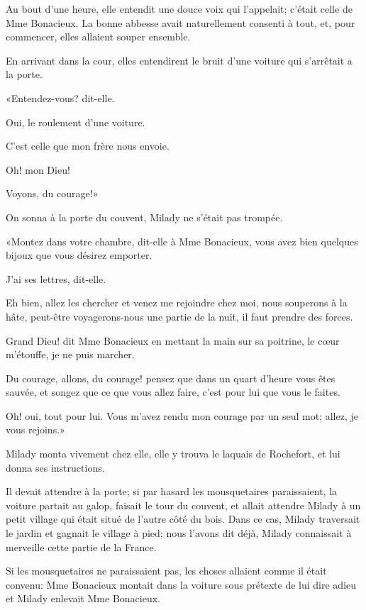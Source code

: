 Au bout d'une heure, elle entendit une douce voix qui l'appelait; c'était celle de Mme Bonacieux. La bonne abbesse avait naturellement consenti à tout, et, pour commencer, elles allaient souper ensemble. 

En arrivant dans la cour, elles entendirent le bruit d'une voiture qui s'arrêtait a la porte. 

«Entendez-vous? dit-elle. 

\speak  Oui, le roulement d'une voiture. 

\speak  C'est celle que mon frère nous envoie. 

\speak  Oh! mon Dieu! 

\speak  Voyons, du courage!» 

On sonna à la porte du couvent, Milady ne s'était pas trompée. 

«Montez dans votre chambre, dit-elle à Mme Bonacieux, vous avez bien quelques bijoux que vous désirez emporter. 

\speak  J'ai ses lettres, dit-elle. 

\speak  Eh bien, allez les chercher et venez me rejoindre chez moi, nous souperons à la hâte, peut-être voyagerons-nous une partie de la nuit, il faut prendre des forces. 

\speak  Grand Dieu! dit Mme Bonacieux en mettant la main sur sa poitrine, le cœur m'étouffe, je ne puis marcher. 

\speak  Du courage, allons, du courage! pensez que dans un quart d'heure vous êtes sauvée, et songez que ce que vous allez faire, c'est pour lui que vous le faites. 

\speak  Oh! oui, tout pour lui. Vous m'avez rendu mon courage par un seul mot; allez, je vous rejoins.» 

Milady monta vivement chez elle, elle y trouva le laquais de Rochefort, et lui donna ses instructions. 

Il devait attendre à la porte; si par hasard les mousquetaires paraissaient, la voiture partait au galop, faisait le tour du couvent, et allait attendre Milady à un petit village qui était situé de l'autre côté du bois. Dans ce cas, Milady traversait le jardin et gagnait le village à pied; nous l'avons dit déjà, Milady connaissait à merveille cette partie de la France. 

Si les mousquetaires ne paraissaient pas, les choses allaient comme il était convenu: Mme Bonacieux montait dans la voiture sous prétexte de lui dire adieu et Milady enlevait Mme Bonacieux. 

